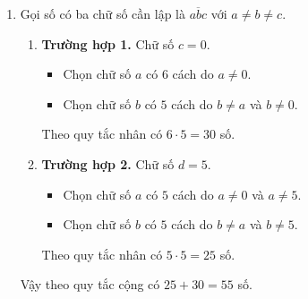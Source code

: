 \begin{vd}
{\begin{enumerate}
\begin{enumerate}
				      \item \textbf{Trường hợp 2.} Chữ số $c\in \{2;4;6;8\}$ nên có $4$ cách chọn.
				            \begin{itemize}
					            \item Chọn chữ số $a$ có $5$ cách do $a\ne 0$ và $a \ne c$.
					            \item Chọn chữ số $b$ có $5$ cách do $b\ne a$ và $b\ne c$.
				            \end{itemize}
				            Theo quy tắc nhân có $4\cdot 5\cdot 5=100$ số.
			      \end{enumerate}
			      Vậy theo quy tắc cộng có $30+100=130$ số.
			\item Gọi số có ba chữ số cần lập là $\overline{abc}$ với $a\ne b\ne c$.
			      \begin{enumerate}
				      \item \textbf{Trường hợp 1.} Chữ số $c=0$.
				            \begin{itemize}
					            \item Chọn chữ số $a$ có $6$ cách do $a\ne 0$.
					            \item Chọn chữ số $b$ có $5$ cách do $b\ne a$ và $b\ne 0$.
				            \end{itemize}
				            Theo quy tắc nhân có $6\cdot 5=30$ số.
				      \item \textbf{Trường hợp 2.} Chữ số $d=5$.
				            \begin{itemize}
					            \item Chọn chữ số $a$ có $5$ cách do $a\ne 0$ và $a \ne 5$.
					            \item Chọn chữ số $b$ có $5$ cách do $b\ne a$ và $b\ne 5$.
				            \end{itemize}
				            Theo quy tắc nhân có $5\cdot 5=25$ số.
			      \end{enumerate}
			      Vậy theo quy tắc cộng có $25+30=55$ số.
		\end{enumerate}
	}
\end{vd}
